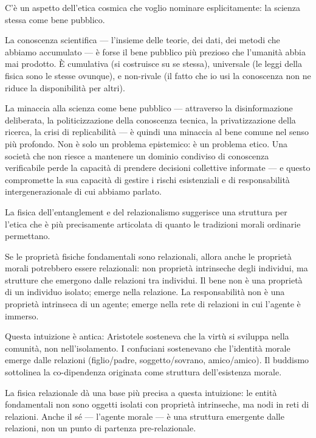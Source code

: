 \documentclass[12pt,a4paper,openany]{book}
\newcommand{\sezione}[1]{\vspace{1.2em}{\large\bfseries #1}\vspace{0.5em}\par}
\begin{document}
\sezione{La scienza come bene pubblico globale}

C'è un aspetto dell'etica cosmica che voglio nominare esplicitamente: la scienza stessa come bene pubblico.

La conoscenza scientifica --- l'insieme delle teorie, dei dati, dei metodi che abbiamo accumulato --- è forse il bene pubblico più prezioso che l'umanità abbia mai prodotto. È cumulativa (si costruisce su se stessa), universale (le leggi della fisica sono le stesse ovunque), e non-rivale (il fatto che io usi la conoscenza non ne riduce la disponibilità per altri).

La minaccia alla scienza come bene pubblico --- attraverso la disinformazione deliberata, la politicizzazione della conoscenza tecnica, la privatizzazione della ricerca, la crisi di replicabilità --- è quindi una minaccia al bene comune nel senso più profondo. Non è solo un problema epistemico: è un problema etico. Una società che non riesce a mantenere un dominio condiviso di conoscenza verificabile perde la capacità di prendere decisioni collettive informate --- e questo compromette la sua capacità di gestire i rischi esistenziali e di responsabilità intergenerazionale di cui abbiamo parlato.

\sezione{La reciprocità come struttura dell'etica}

La fisica dell'entanglement e del relazionalismo suggerisce una struttura per l'etica che è più precisamente articolata di quanto le tradizioni morali ordinarie permettano.

Se le proprietà fisiche fondamentali sono relazionali, allora anche le proprietà morali potrebbero essere relazionali: non proprietà intrinseche degli individui, ma strutture che emergono dalle relazioni tra individui. Il bene non è una proprietà di un individuo isolato; emerge nella relazione. La responsabilità non è una proprietà intrinseca di un agente; emerge nella rete di relazioni in cui l'agente è immerso.

Questa intuizione è antica: Aristotele sosteneva che la virtù si sviluppa nella comunità, non nell'isolamento. I confuciani sostenevano che l'identità morale emerge dalle relazioni (figlio/padre, soggetto/sovrano, amico/amico). Il buddismo sottolinea la co-dipendenza originata come struttura dell'esistenza morale.

La fisica relazionale dà una base più precisa a questa intuizione: le entità fondamentali non sono oggetti isolati con proprietà intrinseche, ma nodi in reti di relazioni. Anche il sé --- l'agente morale --- è una struttura emergente dalle relazioni, non un punto di partenza pre-relazionale.
\end{document}
